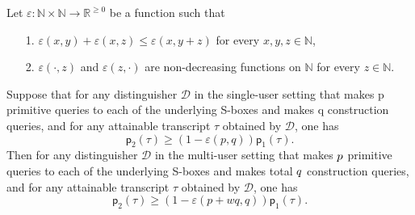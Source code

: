 \begin{lemma}
	\label{lemma:point-wise}
	
	Let $\varepsilon : \mathbb{N} \times \mathbb{N} \rightarrow \mathbb{R}^{\geq 0}$ be a function such that
	\begin{itemize}
		\item[1.] $\varepsilon (x, y) + \varepsilon (x, z) \leq \varepsilon (x, y + z)$ for every $x, y, z \in \mathbb{N}$,
		\item[2.] $\varepsilon (\cdot, z)$ and $\varepsilon (z, \cdot)$ are non-decreasing functions on $\mathbb{N}$ for every $z \in \mathbb{N}$.
	\end{itemize}
	Suppose that for any distinguisher $\mathcal{D}$ in the single-user setting that makes p primitive queries to each of the underlying S-boxes and makes q construction queries, and for any attainable transcript $\tau$ obtained by $\mathcal{D}$, one has
	$$
	\mathsf{p}_{2}(\tau) \geq (1 - \varepsilon(p,q)) \mathsf{p}_{1}(\tau).
	$$
	Then for any distinguisher $\mathcal{D}$ in the multi-user setting that makes $\mathnormal{p}$ primitive queries to each of the underlying S-boxes and makes total $\mathnormal{q}$ construction queries, and for any attainable transcript $\tau$ obtained by $\mathcal{D}$, one has
	$$
	\mathsf{p}_{2}(\tau) \geq (1 - \varepsilon(p + wq,q)) \mathsf{p}_{1}(\tau).
	$$
\end{lemma}



%
%
%
%
%
%


